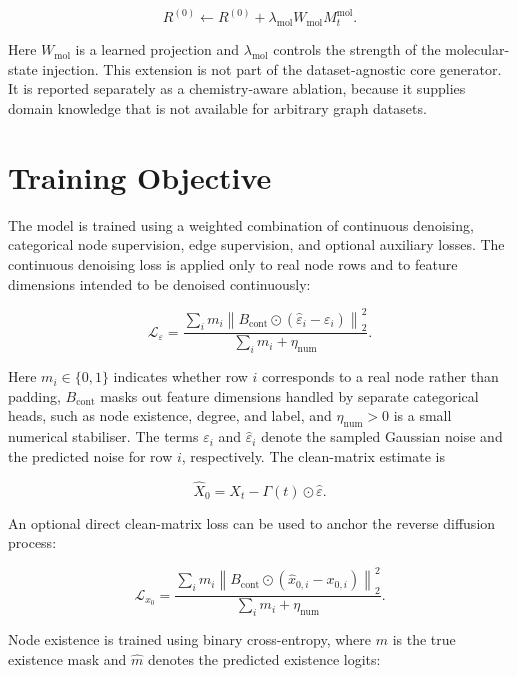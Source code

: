 \[
    R^{(0)}
    \leftarrow
    R^{(0)}
    + \lambda_{\mathrm{mol}} W_{\mathrm{mol}} M_t^{\mathrm{mol}}.
\]

Here \(W_{\mathrm{mol}}\) is a learned projection and
\(\lambda_{\mathrm{mol}}\) controls the strength of the molecular-state
injection. This extension is not part of the dataset-agnostic core generator.
It is reported separately as a chemistry-aware ablation, because it supplies
domain knowledge that is not available for arbitrary graph datasets.

\section{Training Objective}
\label{sec:generator:objective}

The model is trained using a weighted combination of continuous denoising,
categorical node supervision, edge supervision, and optional auxiliary losses.
The continuous denoising loss is applied only to real node rows and to feature
dimensions intended to be denoised continuously:

\[
    \mathcal{L}_{\varepsilon}
    =
    \frac{
        \sum_i m_i
        \left\|
            B_{\mathrm{cont}}
            \odot
            (\hat{\varepsilon}_i - \varepsilon_i)
        \right\|_2^2
    }{
        \sum_i m_i + \eta_{\mathrm{num}}
    }.
\]

Here \(m_i\in\{0,1\}\) indicates whether row \(i\) corresponds to a real node
rather than padding, \(B_{\mathrm{cont}}\) masks out feature dimensions handled
by separate categorical heads, such as node existence, degree, and label, and
\(\eta_{\mathrm{num}}>0\) is a small numerical stabiliser. The terms
\(\varepsilon_i\) and \(\hat{\varepsilon}_i\) denote the sampled Gaussian noise
and the predicted noise for row \(i\), respectively. The clean-matrix estimate is

\[
    \hat{X}_0 = X_t - \Gamma(t)\odot \hat{\varepsilon}.
\]

An optional direct clean-matrix loss can be used to anchor the reverse diffusion
process:

\[
    \mathcal{L}_{x_0}
    =
    \frac{
        \sum_i m_i
        \left\|
            B_{\mathrm{cont}}
            \odot
            (\hat{x}_{0,i} - x_{0,i})
        \right\|_2^2
    }{
        \sum_i m_i + \eta_{\mathrm{num}}
    }.
\]

Node existence is trained using binary cross-entropy, where \(m\) is the true
existence mask and \(\hat m\) denotes the predicted existence logits:

